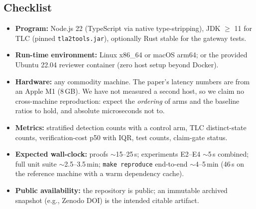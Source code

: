 \documentclass[10pt,twocolumn,letterpaper]{article}
\begin{document}
\subsection{Checklist}
\begin{itemize}
\item \textbf{Program:} Node.js 22 (TypeScript via native type-stripping),
  JDK $\ge$ 11 for TLC (pinned \texttt{tla2tools.jar}), optionally Rust
  stable for the gateway tests.
\item \textbf{Run-time environment:} Linux x86\_64 or macOS arm64; or the
  provided Ubuntu 22.04 reviewer container (zero host setup beyond Docker).
\item \textbf{Hardware:} any commodity machine. The paper's latency numbers
  are from an Apple M1 (8\,GB). We have not measured a second host, so we
  claim no cross-machine reproduction: expect the \emph{ordering} of arms and
  the baseline ratios to hold, and absolute microseconds not to.
\item \textbf{Metrics:} stratified detection counts with a control arm, TLC
  distinct-state counts, verification-cost p50 with IQR, test counts,
  claim-gate status.
\item \textbf{Expected wall-clock:} proofs $\sim$15--25\,s; experiments E2--E4
  $\sim$5\,s combined; full unit suite $\sim$2.5--3.5\,min;
  \texttt{make reproduce} end-to-end $\sim$4--5\,min (46\,s on the reference
  machine with a warm dependency cache).
\item \textbf{Public availability:} the repository is public; an immutable
  archived snapshot (e.g., Zenodo DOI) is the intended citable artifact.
\end{itemize}
\end{document}
